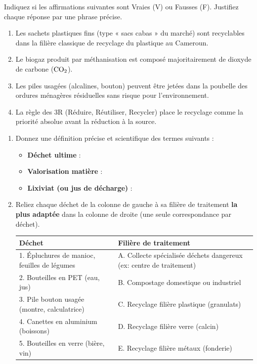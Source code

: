 \documentclass[11pt]{article}
\begin{document}
\begin{exercice}
Indiquez si les affirmations suivantes sont Vraies (V) ou Fausses (F). Justifiez chaque réponse par une phrase précise.

\begin{enumerate}
    \item Les sachets plastiques fins (type « sacs cabas » du marché) sont recyclables dans la filière classique de recyclage du plastique au Cameroun.
    \item Le biogaz produit par méthanisation est composé majoritairement de dioxyde de carbone ($\ce{CO2}$).
    \item Les piles usagées (alcalines, bouton) peuvent être jetées dans la poubelle des ordures ménagères résiduelles sans risque pour l'environnement.
    \item La règle des 3R (Réduire, Réutiliser, Recycler) place le recyclage comme la priorité absolue avant la réduction à la source.
\end{enumerate}
\end{exercice}

\begin{exercice}
\begin{enumerate}
    \item Donnez une définition précise et scientifique des termes suivants :
    \begin{itemize}
        \item \textbf{Déchet ultime} :
        \item \textbf{Valorisation matière} :
        \item \textbf{Lixiviat (ou jus de décharge)} :
    \end{itemize}
    \item Reliez chaque déchet de la colonne de gauche à sa filière de traitement \textbf{la plus adaptée} dans la colonne de droite (une seule correspondance par déchet).
    \begin{center}
        \begin{tabular}{|l|l|}
            \hline
            \textbf{Déchet} & \textbf{Filière de traitement} \\ \hline
            1. Épluchures de manioc, feuilles de légumes & A. Collecte spécialisée déchets dangereux (ex: centre de traitement) \\
            2. Bouteilles en PET (eau, jus) & B. Compostage domestique ou industriel \\
            3. Pile bouton usagée (montre, calculatrice) & C. Recyclage filière plastique (granulats) \\
            4. Canettes en aluminium (boissons) & D. Recyclage filière verre (calcin) \\
            5. Bouteilles en verre (bière, vin) & E. Recyclage filière métaux (fonderie) \\ \hline
        \end{tabular}
    \end{center}
\end{enumerate}
\end{exercice}
\end{document}
